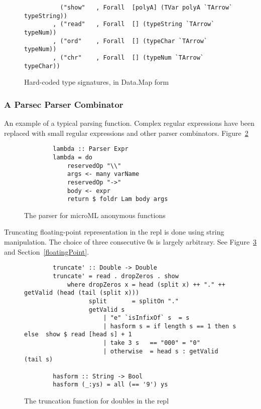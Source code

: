 \begin{figure}
    \begin{verbatim}
          ("show"   , Forall  [polyA] (TVar polyA `TArrow` typeString))
        , ("read"   , Forall  [] (typeString `TArrow` typeNum))
        , ("ord"    , Forall  [] (typeChar `TArrow` typeNum))
        , ("chr"    , Forall  [] (typeNum `TArrow` typeChar))
    \end{verbatim}
    \caption{Hard-coded type signatures, in Data.Map form}
\label{fig:typesigs}
\end{figure}

\subsubsection{A Parsec Parser Combinator}
An example of a typical parsing function. Complex regular expressions have been replaced with small
regular expressions and other parser combinators. Figure~\ref{fig:parsec}

\begin{figure}
    \begin{verbatim}
        lambda :: Parser Expr
        lambda = do
            reservedOp "\\"
            args <- many varName
            reservedOp "->"
            body <- expr
            return $ foldr Lam body args
    \end{verbatim}
    \caption{The parser for microML anonymous functions}
\label{fig:parsec}
\end{figure}
Truncating floating-point representation in the repl is done using string manipulation. The choice
of three consecutive 0s is largely arbitrary. See Figure~\ref{fig:trunc} and
Section~\ref{floatingPoint}.
\begin{figure}
    \begin{verbatim}
        truncate' :: Double -> Double
        truncate' = read . dropZeros . show
            where dropZeros x = head (split x) ++ "." ++ getValid (head (tail (split x)))
                  split       = splitOn "."
                  getValid s 
                      | "e" `isInfixOf` s  = s
                      | hasform s = if length s == 1 then s else  show $ read [head s] + 1
                      | take 3 s   == "000" = "0"
                      | otherwise  = head s : getValid (tail s) 

        hasform :: String -> Bool
        hasform (_:ys) = all (== '9') ys 
    \end{verbatim}
    \caption{The truncation function for doubles in the repl}
\label{fig:trunc}
\end{figure}

